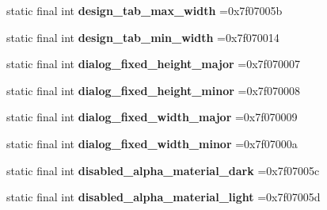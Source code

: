 \begin{DoxyCompactItemize}
\item 
\hypertarget{classcheck_1_1test_1_1_r_1_1dimen_a075d26945281b892980754c4c96a42ac}{}static final int {\bfseries design\+\_\+tab\+\_\+max\+\_\+width} =0x7f07005b\label{classcheck_1_1test_1_1_r_1_1dimen_a075d26945281b892980754c4c96a42ac}

\item 
\hypertarget{classcheck_1_1test_1_1_r_1_1dimen_ab814035959a3a1e5de14220a70afa924}{}static final int {\bfseries design\+\_\+tab\+\_\+min\+\_\+width} =0x7f070014\label{classcheck_1_1test_1_1_r_1_1dimen_ab814035959a3a1e5de14220a70afa924}

\item 
\hypertarget{classcheck_1_1test_1_1_r_1_1dimen_a66b2e33e3a2f8a6bef5acad6ad4c0019}{}static final int {\bfseries dialog\+\_\+fixed\+\_\+height\+\_\+major} =0x7f070007\label{classcheck_1_1test_1_1_r_1_1dimen_a66b2e33e3a2f8a6bef5acad6ad4c0019}

\item 
\hypertarget{classcheck_1_1test_1_1_r_1_1dimen_ad14f27c0659dd588a2500fffb25115ec}{}static final int {\bfseries dialog\+\_\+fixed\+\_\+height\+\_\+minor} =0x7f070008\label{classcheck_1_1test_1_1_r_1_1dimen_ad14f27c0659dd588a2500fffb25115ec}

\item 
\hypertarget{classcheck_1_1test_1_1_r_1_1dimen_a1411f6aa104f2ef19044a5c7f79abdea}{}static final int {\bfseries dialog\+\_\+fixed\+\_\+width\+\_\+major} =0x7f070009\label{classcheck_1_1test_1_1_r_1_1dimen_a1411f6aa104f2ef19044a5c7f79abdea}

\item 
\hypertarget{classcheck_1_1test_1_1_r_1_1dimen_a5ca53451945e5305bb2eb2b5f0604ce8}{}static final int {\bfseries dialog\+\_\+fixed\+\_\+width\+\_\+minor} =0x7f07000a\label{classcheck_1_1test_1_1_r_1_1dimen_a5ca53451945e5305bb2eb2b5f0604ce8}

\item 
\hypertarget{classcheck_1_1test_1_1_r_1_1dimen_afa13873fd184faa1933b6797a342bcb8}{}static final int {\bfseries disabled\+\_\+alpha\+\_\+material\+\_\+dark} =0x7f07005c\label{classcheck_1_1test_1_1_r_1_1dimen_afa13873fd184faa1933b6797a342bcb8}

\item 
\hypertarget{classcheck_1_1test_1_1_r_1_1dimen_a8b1020b31a881b7fdc7b53c27a65f04a}{}static final int {\bfseries disabled\+\_\+alpha\+\_\+material\+\_\+light} =0x7f07005d\label{classcheck_1_1test_1_1_r_1_1dimen_a8b1020b31a881b7fdc7b53c27a65f04a}


\end{DoxyCompactItemize}
